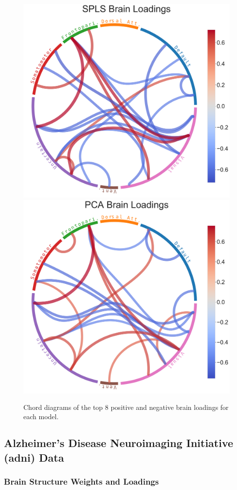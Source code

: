 \begin{figure}
    \includegraphics[width=0.49\linewidth]{figures/hcp/SPLS brain loadings}
    \includegraphics[width=0.49\linewidth]{figures/hcp/PCA brain loadings}
    \caption{Chord diagrams of the top 8 positive and negative brain \gls{loadings} for each model.}\label{fig:chord_loadings}
\end{figure}

\newpage


\subsection{Alzheimer's Disease Neuroimaging Initiative (\acrshort{adni}) Data}

\subsubsection{Brain Structure Weights and Loadings}

